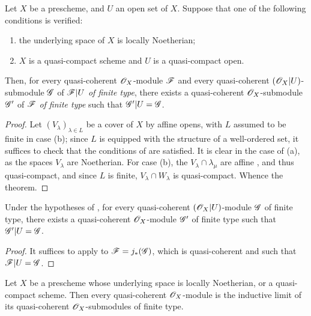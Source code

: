 \begin{thm}[9.4.7]
\label{1.9.4.7}
Let $X$ be a prescheme, and $U$ an open set of $X$. Suppose that one of the following
conditions is verified:
\begin{enumerate}[label=\emph{(\alph*)}]
  \item the underlying space of $X$ is locally Noetherian;
  \item $X$ is a quasi-compact scheme and $U$ is a quasi-compact open.
\end{enumerate}
Then, for every quasi-coherent $\mathscr{O}_X$-module $\mathscr{F}$ and every quasi-coherent
$(\mathscr{O}_X|U)$-submodule $\mathscr{G}$ of $\mathscr{F}|U$ \emph{of finite type}, there exists a
quasi-coherent $\mathscr{O}_X$-submodule $\mathscr{G}'$ of $\mathscr{F}$ \emph{of finite type} such that
$\mathscr{G}'|U=\mathscr{G}$.
\end{thm}

\begin{proof}
\label{proof-1.9.4.7}
Let
$(V_\lambda)_{\lambda\in L}$ be a cover of $X$ by affine opens, with $L$ assumed to be finite
in case (b); since $L$ is equipped with the structure of a well-ordered set, it suffices to
check that the conditions of  are satisfied. It is clear in the case of (a),
as the spaces $V_\lambda$ are Noetherian. For case (b), the $V_\lambda\cap\lambda_\mu$ are
affine , and thus quasi-compact, and since $L$ is finite,
$V_\lambda\cap W_\lambda$ is quasi-compact. Whence the theorem.
\end{proof}

\begin{cor}[9.4.8]
\label{1.9.4.8}
Under the hypotheses of , for every quasi-coherent $(\mathscr{O}_X|U)$-module
$\mathscr{G}$ of finite type, there exists a quasi-coherent $\mathscr{O}_X$-module $\mathscr{G}'$ of finite
type such that $\mathscr{G}'|U=\mathscr{G}$.
\end{cor}

\begin{proof}
\label{proof-1.9.4.8}
It suffices to apply  to $\mathscr{F}=j_*(\mathscr{G})$, which is quasi-coherent
 and such that $\mathscr{F}|U=\mathscr{G}$.
\end{proof}

\begin{cor}[9.4.9]
\label{1.9.4.9}
Let $X$ be a prescheme whose underlying space is locally Noetherian, or a quasi-compact
scheme. Then every quasi-coherent $\mathscr{O}_X$-module is the inductive limit of its quasi-coherent
$\mathscr{O}_X$-submodules of finite type.
\end{cor}

